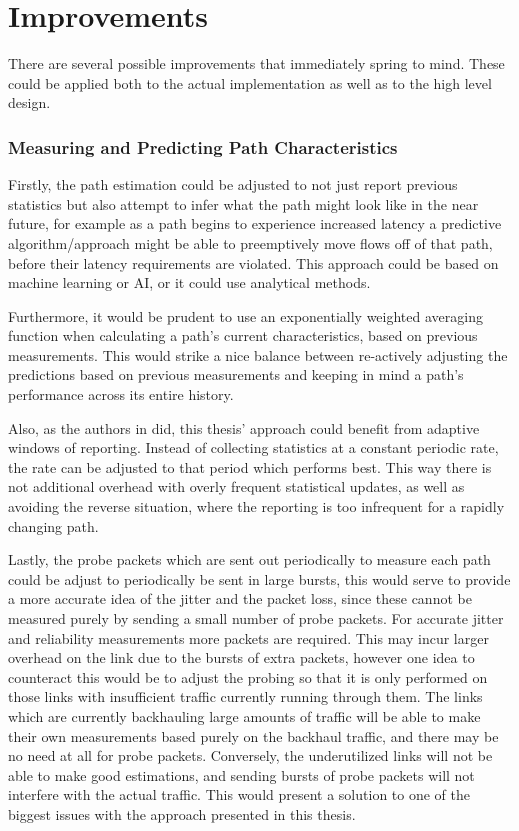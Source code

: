 \section{Improvements}

There are several possible improvements that immediately spring to mind. These could be applied both to the actual implementation as well as to the high level design.

\subsubsection{Measuring and Predicting Path Characteristics}
Firstly, the path estimation could be adjusted to not just report previous statistics but also attempt to infer what the path might look like in the near future, for example as a path begins to experience increased latency a predictive algorithm/approach might be able to preemptively move flows off of that path, before their latency requirements are violated. This approach could be based on machine learning or AI, or it could use analytical methods.

Furthermore, it would be prudent to use an exponentially weighted averaging function when calculating a path's current characteristics, based on previous measurements. This would strike a nice balance between re-actively adjusting the predictions based on previous measurements and keeping in mind a path's performance across its entire history.

Also, as the authors in \cite{habib2007improving} did, this thesis' approach could benefit from adaptive windows of reporting. Instead of collecting statistics at a constant periodic rate, the rate can be adjusted to that period which performs best. This way there is not additional overhead with overly frequent statistical updates, as well as avoiding the reverse situation, where the reporting is too infrequent for a rapidly changing path.

Lastly, the probe packets which are sent out periodically to measure each path could be adjust to periodically be sent in large bursts, this would serve to provide a more accurate idea of the jitter and the packet loss, since these cannot be measured purely by sending a small number of probe packets. For accurate jitter and reliability measurements more packets are required. This may incur larger overhead on the link due to the bursts of extra packets, however one idea to counteract this would be to adjust the probing so that it is only performed on those links with insufficient traffic currently running through them. The links which are currently backhauling large amounts of traffic will be able to make their own measurements based purely on the backhaul traffic, and there may be no need at all for probe packets. Conversely, the underutilized links will not be able to make good estimations, and sending bursts of probe packets will not interfere with the actual traffic. This would present a solution to one of the biggest issues with the approach presented in this thesis.

